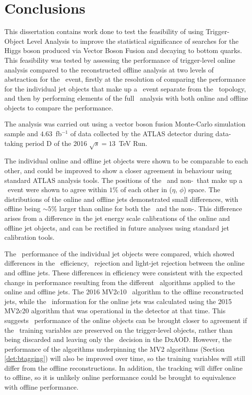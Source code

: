 \chapter{Conclusions}
\label{c:c}

This dissertation contains work done to test the feasibility of using Trigger-Object Level Analysis to improve the statistical significance of searches for the Higgs boson produced via Vector Boson Fusion and decaying to bottom quarks. This feasibility was tested by assessing the performance of trigger-level online analysis compared to the reconstructed offline analysis at two levels of abstraction for the \VBFHBB\ event, firstly at the resolution of comparing the performance for the individual jet objects that make up a \VBFHBB\ event separate from the \VBFHBB\ topology, and then by performing elements of the full \VBFHBB\ analysis with both online and offline objects to compare the performance.

The analysis was carried out using a vector boson fusion Monte-Carlo simulation sample and $4.63$~fb$^{-1}$ of data collected by the ATLAS detector during data-taking period D of the 2016 $\sqrt{s}=13$~TeV Run.

The individual online and offline jet objects were shown to be comparable to each other, and could be improved to show a closer agreement in behaviour using standard ATLAS analysis tools. The positions of the \bjets\ and non-\bjets\ that make up a \VBFHBB\ event were shown to agree within $1\%$ of each other in ($\eta$, $\phi$) space. The \pt distributions of the online and offline jets demonstrated small differences, with offline \pt being $\sim5\%$ larger than online \pt for both the \bjets\ and the non-\bjets. This \pt difference arises from a difference in the jet energy scale calibrations of the online and offline jet objects, and can be rectified in future analyses using standard jet calibration tools.

The \btag\ performance of the individual jet objects were compared, which showed differences in the \btag\ efficiency, \cjet\ rejection and light-jet rejection between the online and offline jets. These differences in efficiency were consistent with the expected change in performance  resulting from the different \btag\ algorithms applied to the online and offline jets. The 2016 MV2c10 \btag\ algorithm to the offline reconstructed jets, while the \btag\ information for the online jets was calculated using the 2015 MV2c20 algorithm that was operational in the detector at that time. This suggests \btag\ performance of the online objects can be brought closer to agreement if the \btag\ training variables are preserved on the trigger-level objects, rather than being discarded and leaving only the \btag\ decision in the DxAOD. However, the performance of the algorithms underpinning the MV2 algorithms (Section \ref{det:btagging}) will also be improved over time, so the training variables will still differ from the offline reconstructions. In addition, the tracking will differ online to offline, so it is unlikely online performance could be brought to equivalence with offline performance.

